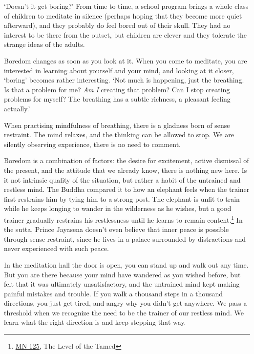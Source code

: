 \clearpage


`Doesn't it get boring?' From time to time, a school program brings a
whole class of children to meditate in silence (perhaps hoping that they
become more quiet afterward), and they probably do feel bored out of
their skull. They had no interest to be there from the outset, but
children are clever and they tolerate the strange ideas of the adults.

Boredom changes as soon as you look at it. When you come to meditate,
you are interested in learning about yourself and your mind, and looking
at it closer, `boring' becomes rather interesting. `Not much is
happening, just the breathing. Is that a problem for me? \emph{Am I}
creating that problem? Can I stop creating problems for myself? The
breathing has a subtle richness, a pleasant feeling actually.'

When practising mindfulness of breathing, there is a gladness born of
sense restraint. The mind relaxes, and the thinking can be allowed to
stop. We are silently observing experience, there is no need to comment.

Boredom is a combination of factors: the desire for excitement, active
dismissal of the present, and the attitude that we already know, there
is nothing new here. Is it not intrinsic quality of the situation, but
rather a habit of the untrained and restless mind. The Buddha compared
it to how an elephant feels when the trainer first restrains him by
tying him to a strong post. The elephant is unfit to train while he
keeps longing to wander in the wilderness as he wishes, but a good
trainer gradually restrains his restlessness until he learns to remain
content.\footnote{\href{https://suttacentral.net/mn125}{MN 125}, The
  Level of the Tamed} In the sutta, Prince Jayasena doesn't even believe
that inner peace is possible through sense-restraint, since he lives in
a palace surrounded by distractions and never experienced with such
peace.

In the meditation hall the door is open, you can stand up and walk out
any time. But you are there because your mind have wandered as you
wished before, but felt that it was ultimately unsatisfactory, and the
untrained mind kept making painful mistakes and trouble. If you walk a
thousand steps in a thousand directions, you just get tired, and angry
why you didn't get anywhere. We pass a threshold when we recognize the
need to be the trainer of our restless mind. We learn what the right
direction is and keep stepping that way.

